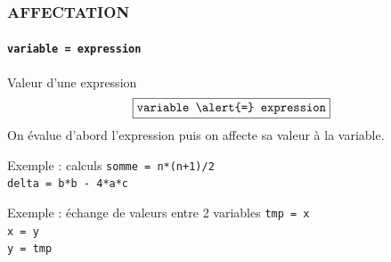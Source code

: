 \begin{frame}
\frametitle{\uppercase{Affectation}}
\framesubtitle{\tt variable \alert{=} expression}
\begin{block}{Valeur d'une expression}
$$\framebox{\tt variable \alert{=} expression}$$
On évalue d'abord l'expression puis on affecte sa valeur
à la variable.
\end{block}
\begin{block}{Exemple : calculs}
\tt somme \alert{=} n*(n+1)/2\\%
\tt delta \alert{=} b*b - 4*a*c
\end{block}


\begin{block}{Exemple : échange de valeurs entre 2 variables}
\tt tmp \alert{=} x\\
\tt x \alert{=} y\\
\tt y \alert{=} tmp
\end{block}


\end{frame}


